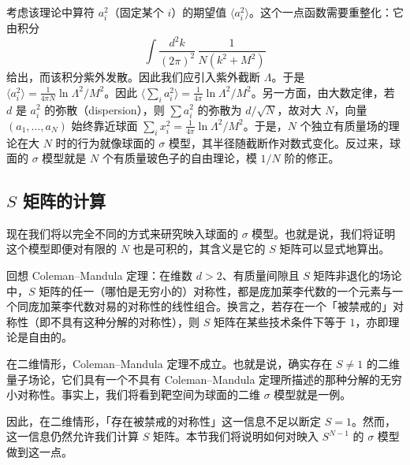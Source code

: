 考虑该理论中算符 $a_i^2$（固定某个 $i$）的期望值 $\langle a_i^2\rangle$。这个一点函数需要重整化：它由积分
\begin{equation}
  \tag{4.15}
  \label{eq:4-15}
  \int\frac{d^2k}{(2\pi)^2}\,\frac{1}{N(k^2+M^2)}
\end{equation}
给出，而该积分紫外发散。因此我们应引入紫外截断 $\Lambda$。于是 $\langle a_i^2\rangle=\frac{1}{4\pi N}\ln\Lambda^2/M^2$。因此 $\bigl\langle\sum_i a_i^2\bigr\rangle=\frac{1}{4\pi}\ln\Lambda^2/M^2$。另一方面，由大数定律，若 $d$ 是 $a_i^2$ 的弥散（dispersion），则 $\sum a_i^2$ 的弥散为 $d/\sqrt{N}$，故对大 $N$，向量 $(a_1,\dots,a_N)$ 始终靠近球面 $\sum_i x_i^2=\frac{1}{4\pi}\ln\Lambda^2/M^2$。于是，$N$ 个独立有质量场的理论在大 $N$ 时的行为就像球面的 $\sigma$ 模型，其半径随截断作对数式变化。反过来，球面的 $\sigma$ 模型就是 $N$ 个有质量玻色子的自由理论，模 $1/N$ 阶的修正。


\subsection{$S$ 矩阵的计算}

现在我们将以完全不同的方式来研究映入球面的 $\sigma$ 模型。也就是说，我们将证明这个模型即便对有限的 $N$ 也是可积的，其含义是它的 $S$ 矩阵可以显式地算出。

回想 Coleman–Mandula 定理：在维数 $d>2$、有质量间隙且 $S$ 矩阵非退化的场论中，$S$ 矩阵的任一（哪怕是无穷小的）对称性，都是庞加莱李代数的一个元素与一个同庞加莱李代数对易的对称性的线性组合。换言之，若存在一个「被禁戒的」对称性（即不具有这种分解的对称性），则 $S$ 矩阵在某些技术条件下等于 $1$，亦即理论是自由的。

在二维情形，Coleman–Mandula 定理不成立。也就是说，确实存在 $S\ne1$ 的二维量子场论，它们具有一个不具有 Coleman–Mandula 定理所描述的那种分解的无穷小对称性。事实上，我们将看到靶空间为球面的二维 $\sigma$ 模型就是一例。

因此，在二维情形，「存在被禁戒的对称性」这一信息不足以断定 $S=1$。然而，这一信息仍然允许我们计算 $S$ 矩阵。本节我们将说明如何对映入 $S^{N-1}$ 的 $\sigma$ 模型做到这一点。

